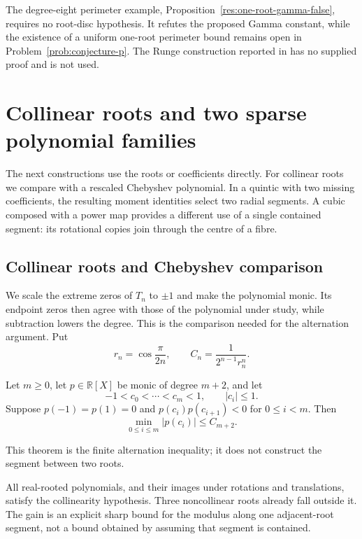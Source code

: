 The degree-eight perimeter example, Proposition~\ref{res:one-root-gamma-false},
requires no root-disc hypothesis. It refutes the proposed Gamma constant,
while the existence of a uniform one-root perimeter bound remains open
in Problem~\ref{prob:conjecture-p}. The Runge construction reported in
\cite[Proposition~2]{revision2026} has no supplied proof and is not used.

\section{Collinear roots and two sparse polynomial families}
\label{sec:solved-polynomial-families}

The next constructions use the roots or coefficients directly. For
collinear roots we compare with a rescaled Chebyshev polynomial. In a
quintic with two missing coefficients, the resulting moment identities
select two radial segments. A cubic composed with a power map provides
a different use of a single contained segment: its rotational copies
join through the centre of a fibre.

\subsection{Collinear roots and Chebyshev comparison}
\label{subsec:sharp-collinear-chebyshev}

We scale the extreme zeros of $T_n$ to $\pm1$ and make the polynomial
monic. Its endpoint zeros then agree with those of the polynomial under
study, while subtraction lowers the degree. This is the comparison
needed for the alternation argument. Put
\[
 r_n=\cos\frac{\pi}{2n},
 \qquad C_n=\frac{1}{2^{n-1}r_n^n}.
\]

\begin{theorem}
\label{prop:sharp-collinear-chebyshev-comparator}
Let $m\ge0$, let $p\in\mathbb R[X]$ be monic of degree $m+2$, and let
\[
 -1<c_0<\cdots<c_m<1,\qquad |c_i|\le1.
\]
Suppose $p(-1)=p(1)=0$ and
$p(c_i)p(c_{i+1})<0$ for $0\le i<m$.  Then
\[
 \min_{0\le i\le m}|p(c_i)|\le C_{m+2}.
\]
\end{theorem}

This theorem is the finite alternation inequality; it does not construct
the segment between two roots.

All real-rooted polynomials, and their images under rotations and
translations, satisfy the collinearity hypothesis. Three noncollinear
roots already fall outside it. The gain is an explicit sharp bound for
the modulus along one adjacent-root segment, not a bound obtained by
assuming that segment is contained.

